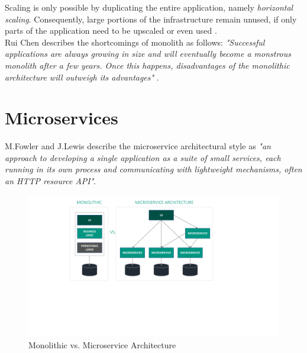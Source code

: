 Scaling is only possible by duplicating the entire application, namely \textit{horizontal scaling}. Consequently, large portions of the infrastructure remain unused, if only parts of the application need to be upscaled or even used \cite{EnticeApproach} \cite{MigratingTowardsSurvey}. \\
Rui Chen describes the shortcomings of monolith as follows:\textit{ "Successful applications
are always growing in size and will eventually become a
monstrous monolith after a few years. Once this happens,
disadvantages of the monolithic architecture will outweigh
its advantages" }\cite{DataflowDrivenChen}.



\section{Microservices}
\label{sec:background:microservices}
M.Fowler and J.Lewis describe the microservice architectural style as \textit{"an approach to developing a single application as a suite of small services, each running in its own process and communicating with lightweight mechanisms, often an HTTP resource API"}\cite{Fowler}.

\begin{figure}[t]
	\includegraphics[width=\textwidth, trim={5cm 8cm 8cm 3cm}]{img/Architektur.pdf}
	\caption{Monolithic vs. Microservice Architecture}
	\label{fig:architekturMonolithVsMS}
\end{figure}

